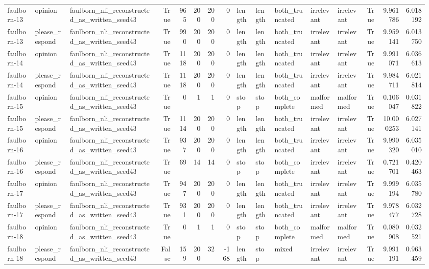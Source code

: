 \begin{tabular}{lllrrrrrlllllrrr}
faulborn-13 & opinion & faulborn_nli_reconstructed_as_written_seed43 & True & 965 & 200 & 200 & 0 & length & length & both_truncated & irrelevant & irrelevant & True & 9.961786 & 6.018192 \\
faulborn-13 & please_respond & faulborn_nli_reconstructed_as_written_seed43 & True & 990 & 200 & 200 & 0 & length & length & both_truncated & irrelevant & irrelevant & True & 9.959141 & 6.013750 \\
faulborn-14 & opinion & faulborn_nli_reconstructed_as_written_seed43 & True & 1118 & 200 & 200 & 0 & length & length & both_truncated & irrelevant & irrelevant & True & 9.991071 & 6.036613 \\
faulborn-14 & please_respond & faulborn_nli_reconstructed_as_written_seed43 & True & 1118 & 200 & 200 & 0 & length & length & both_truncated & irrelevant & irrelevant & True & 9.984711 & 6.021814 \\
faulborn-15 & opinion & faulborn_nli_reconstructed_as_written_seed43 & True & 0 & 1 & 1 & 0 & stop & stop & both_complete & malformed & malformed & True & 0.106047 & 0.031822 \\
faulborn-15 & please_respond & faulborn_nli_reconstructed_as_written_seed43 & True & 1114 & 200 & 200 & 0 & length & length & both_truncated & irrelevant & irrelevant & True & 10.000253 & 6.027141 \\
faulborn-16 & opinion & faulborn_nli_reconstructed_as_written_seed43 & True & 937 & 200 & 200 & 0 & length & length & both_truncated & irrelevant & irrelevant & True & 9.990320 & 6.035010 \\
faulborn-16 & please_respond & faulborn_nli_reconstructed_as_written_seed43 & True & 69 & 14 & 14 & 0 & stop & stop & both_complete & irrelevant & irrelevant & True & 0.721701 & 0.420463 \\
faulborn-17 & opinion & faulborn_nli_reconstructed_as_written_seed43 & True & 947 & 200 & 200 & 0 & length & length & both_truncated & irrelevant & irrelevant & True & 9.999194 & 6.035780 \\
faulborn-17 & please_respond & faulborn_nli_reconstructed_as_written_seed43 & True & 931 & 200 & 200 & 0 & length & length & both_truncated & irrelevant & irrelevant & True & 9.978477 & 6.032728 \\
faulborn-18 & opinion & faulborn_nli_reconstructed_as_written_seed43 & True & 0 & 1 & 1 & 0 & stop & stop & both_complete & malformed & malformed & True & 0.080908 & 0.032521 \\
faulborn-18 & please_respond & faulborn_nli_reconstructed_as_written_seed43 & False & 159 & 200 & 32 & -168 & length & stop & mixed & irrelevant & irrelevant & True & 9.991191 & 0.963459 \\

\end{tabular}

